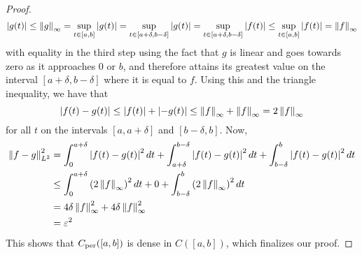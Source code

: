 \documentclass[../thesis.tex]{subfiles}
\begin{document}
\begin{proof}
    \begin{equation*}
        \left|g(t)\right| \leq \left \|g\right \|_{\infty} = \sup_{t\in[a,b]} \left|g(t)\right| = \sup_{t\in[a+\delta, b-\delta]} \left|g(t)\right| = \sup_{t\in[a+\delta, b-\delta]} \left|f(t)\right| \leq \sup_{t\in[a, b]} \left|f(t)\right| =\left \|f\right \|_{\infty}
    \end{equation*}
    with equality in the third step using the fact that $g$ is linear and goes towards zero as it approaches $0$ or $b$, and therefore attains its greatest value on the interval $[a+\delta,b-\delta]$ where it is equal to $f$. Using this and the triangle inequality, we have that
    \begin{equation*}
        \left|f(t)-g(t)\right| \leq \left|f(t)\right| + \left|-g(t)\right| \leq \left \|f\right \|_{\infty} + \left \|f\right \|_{\infty} = 2 \left \|f\right \|_{\infty}
    \end{equation*}
    for all $t$ on the intervals $[a, a+\delta]$ and $[b-\delta,b]$. Now,
    \begin{align*}
        \left \|f-g\right \|_{L^2}^2 &=  \int_0^{a+\delta} \left|f(t)-g(t)\right|^2 dt + \int_{a+\delta}^{b-\delta} \left|f(t)-g(t)\right|^2 dt +\int_{b-\delta}^{b} \left|f(t)-g(t)\right|^2 dt\\ 
        &\leq \int_0^{a+\delta} \left(2 \left \|f\right \|_{\infty}\right)^2 dt + 0 +\int_{b-\delta}^{b} \left(2 \left \|f\right \|_{\infty}\right)^2 dt\\
        &=  4 \delta \left \|f\right \|_{\infty}^2 + 4 \delta \left \|f\right \|_{\infty}^2\\ 
        &= \varepsilon^2
    \end{align*}
    This shows that $C_{\text{per}}([a,b])$ is dense in $C([a,b])$, which finalizes our proof.
\end{proof}
\end{document}
